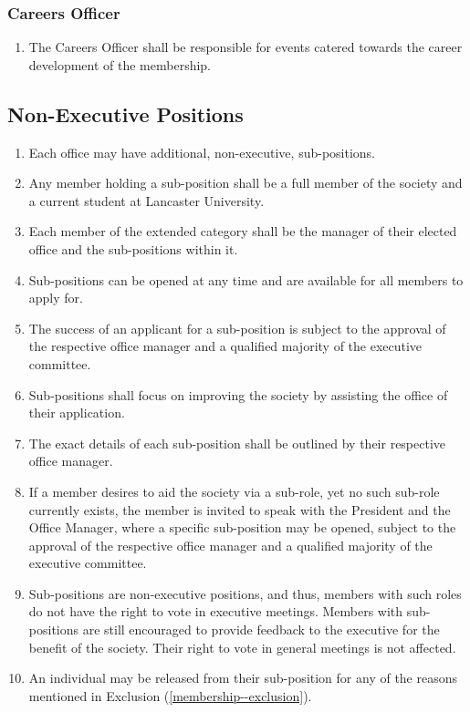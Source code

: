 \documentclass[parskip=half]{scrartcl}
\begin{document}
            \subsubsection{Careers Officer}
                \label{executive--executive-positions--careers-officer}
                \begin{enumerate}
                    \item The Careers Officer shall be responsible for events catered towards the career development of the membership.
                \end{enumerate}

        \subsection{Non-Executive Positions}
            \label{executive--non-executive-positions}
            \begin{enumerate}
                \item Each office may have additional, non-executive, sub-positions.
                \item Any member holding a sub-position shall be a full member of the society and a current student at Lancaster University.
                \item Each member of the extended category shall be the manager of their elected office and the sub-positions within it.
                \item Sub-positions can be opened at any time and are available for all members to apply for.
                \item The success of an applicant for a sub-position is subject to the approval of the respective office manager and a qualified majority of the executive committee.
                \item Sub-positions shall focus on improving the society by assisting the office of their application.
                \item The exact details of each sub-position shall be outlined by their respective office manager.
                \item If a member desires to aid the society via a sub-role, yet no such sub-role currently exists, the member is invited to speak with the President and the Office Manager, where a specific sub-position may be opened, subject to the approval of the respective office manager and a qualified majority of the executive committee.
                \item Sub-positions are non-executive positions, and thus, members with such roles do not have the right to vote in executive meetings. Members with sub-positions are still encouraged to provide feedback to the executive for the benefit of the society. Their right to vote in general meetings is not affected. 
                \item An individual may be released from their sub-position for any of the reasons mentioned in Exclusion (\ref{membership--exclusion}).

            \end{enumerate}
\end{document}
